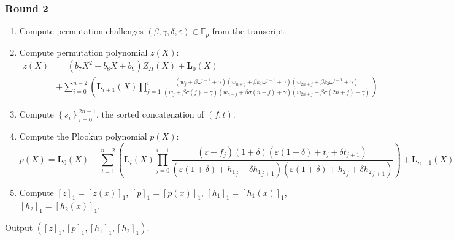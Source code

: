 \documentclass[fleqn]{article}
\begin{document}
			\subsubsection*{Round 2}
				\begin{enumerate}
					\item Compute permutation challenges $(\beta, \gamma, \delta, \varepsilon )\in \mathbb{F}_p$ from the transcript.
	    
					\item Compute permutation polynomial $z(X)$:
						\begin{align*} 
						z(X) &= (b_7X^2+b_8X+b_9)Z_H(X) + \textbf{L}_0(X) \\ 
						&+ \sum_{i=0}^{n-2}\left(\textbf{L}_{i+1}(X)\prod_{j=1}^{i}\frac{(w_j+\beta\omega^{j-1}+\gamma)(w_{n+j}+\beta k_1\omega^{j-1}+\gamma)(w_{2n+j}+\beta k_2\omega^{j-1}+\gamma)}{(w_j+\beta\sigma(j)+\gamma)(w_{n+j}+\beta\sigma(n+j)+\gamma)(w_{2n+j}+\beta\sigma(2n+j)+\gamma)}\right)
						\end{align*}
	                
					\item Compute $\left\{s_i\right\}_{i=0}^{2n-1}$, the sorted concatenation of $(f,t)$.
							                
					\item Compute the Plookup polynomial $p(X)$:	                
	               				\[p(X)= \textbf{L}_0(X) + \sum_{i=1}^{n-2} \left( \textbf{L}_i(X) \prod_{j=0}^{i-1}\frac{(\varepsilon+f_j)(1+\delta)(\varepsilon(1+\delta)+t_j+\delta t_{j+1})}{(\varepsilon(1+\delta)+{h_1}_j+\delta{h_1}_{j+1})(\varepsilon(1+\delta)+{h_2}_j+\delta{h_2}_{j+1})} \right)+ \textbf{L}_{n-1}(X)\]
	                
					\item Compute $[z]_1 = [z(x)]_1$, $[p]_1 = [p(x)]_1$, $[h_1]_1 = [h_1(x)]_1$, $[h_2]_1 = [h_2(x)]_1$.
				 \end{enumerate}

				Output $([z]_1, [p]_1, [h_1]_1, [h_2]_1)$.
\end{document}
